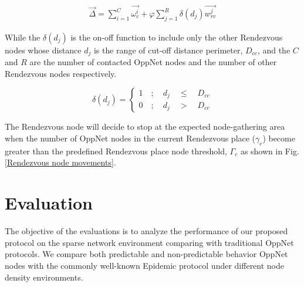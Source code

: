 \begin{eqnarray}
\label{DirectionParameter}
\vec{\Delta} =\sum _{ i=1 }^{ C }{ \vec { { \omega }_{ c }^{ i } }  } + \varphi \sum _{ j=1 }^{ R }{ \delta\left( d_{j} \right)
	\vec { {w }_{ rv }^{ j } }  }
\end{eqnarray}

While the $\delta\left( d_{j} \right)$ is the on-off function to include only the other Rendezvous nodes whose distance $d_j$ is the range of cut-off distance perimeter, $D_{cc}$, and the  $C$ and $R$ are the number of contacted OppNet nodes and the number of other Rendezvous nodes respectively.

\[\delta \left( { d }_{ j } \right) =\begin{cases} 1\quad ;\quad { d }_{ j }\quad \le { \quad D }_{ cc } \\ 0\quad ;\quad { d }_{ j }\quad >{ \quad D }_{ cc } \end{cases}  \] 

The Rendezvous node will decide to stop at the expected node-gathering area when the number of OppNet nodes in the current Rendezvous place ($\gamma_{c}$) become greater than the predefined Rendezvous place node threshold, $\Gamma_{c}$ as shown in Fig. \ref{Rendezvous node movements}. 

\section{Evaluation}
\label{DRRA:Evaluation}
The objective of the evaluations is to analyze the performance of our proposed protocol on the sparse network environment comparing with traditional OppNet protocols.
We compare both predictable and non-predictable behavior OppNet nodes with the commonly well-known Epidemic protocol\cite{Vahdat2000} under different node density environments.


